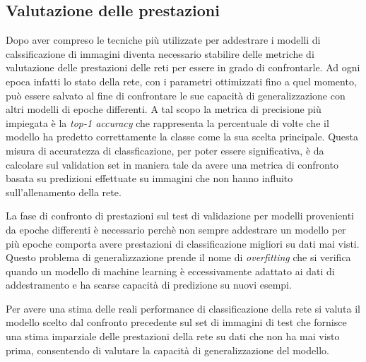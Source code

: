 \subsection{Valutazione delle prestazioni}

Dopo aver compreso le tecniche più utilizzate per addestrare i modelli di calssificazione di immagini diventa necessario stabilire delle metriche di valutazione delle prestazioni delle reti per essere in grado di confrontarle. Ad ogni epoca infatti lo stato della rete, con i parametri ottimizzati fino a quel momento, può essere salvato al fine di confrontare le sue capacità di generalizzazione con altri modelli di epoche differenti. A tal scopo la metrica di precisione più impiegata è la \textit{top-1 accuracy} che rappresenta la percentuale di volte che il modello ha predetto correttamente la classe come la sua scelta principale. Questa misura di accuratezza di classficazione, per poter essere significativa, è da calcolare sul validation set in maniera tale da avere una metrica di confronto basata su predizioni effettuate su immagini che non hanno influito sull'allenamento della rete.

La fase di confronto di prestazioni sul test di validazione per modelli provenienti da epoche differenti è necessario perchè non sempre addestrare un modello per più epoche comporta avere prestazioni di classificazione migliori su dati mai visti. Questo problema di generalizzazione prende il nome di \textit{overfitting} che si verifica quando un modello di machine learning è eccessivamente adattato ai dati di addestramento e ha scarse capacità di predizione su nuovi esempi. 

Per avere una stima delle reali performance di classificazione della rete si valuta il modello scelto dal confronto precedente sul set di immagini di test che fornisce una stima imparziale delle prestazioni della rete su dati che non ha mai visto prima, consentendo di valutare la capacità di generalizzazione del modello.

\iffalse
-----------------------
cose da dire:
\begin{itemize}
    \item Funzionamento delle CNN: panoramica del funzionamento delle CNN, spiegare  convoluzione, pooling e struttura a strati. Descrivere l'importanza dei pesi dei neuroni e delle funzioni di attivazione nel processo di apprendimento delle CNN.
    \item Pre-elaborazione dei dati: Illustrare l'importanza della pre-elaborazione dei dati per la classificazione di immagini, inclusi normalizzazione dei pixel,  riduzione del rumore e gestione delle dimensioni delle immagini.
    \item Addestramento e ottimizzazione dei modelli: Spiegare il processo di addestramento dei modelli, incluso l'utilizzo di dataset, funzioni di costo e l'ottimizzazione dei parametri.
    \item Valutazione delle prestazioni dei modelli: Descrivere le metriche comuni utilizzate per valutare le prestazioni, come accuratezza, precisione, richiamo (f1 score)
\end{itemize}
\fi


